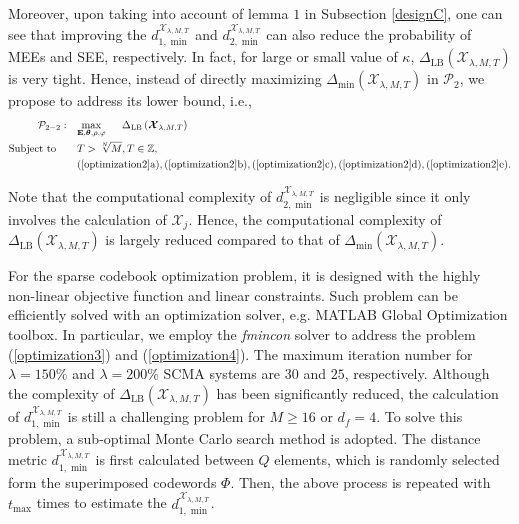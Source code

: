 \documentclass[journal]{IEEEtran}
\begin{document}
Moreover,  upon taking  into account of  lemma $1$ in Subsection \ref{designC}, one can  see that improving the $d_{1, \min}^{   \mathbf {\mathcal X}_{\lambda,M,T}}$ and $d_{2, \min}^{   \mathbf {\mathcal X}_{\lambda,M,T}}$ can also reduce the probability of MEEs and SEE, respectively. In fact, for large or small value of $\kappa$, $\Delta_{\text{LB}}\left( {   \boldsymbol {\mathcal X}_{\lambda,M,T}}\right)$ is very tight.  
Hence, instead of directly maximizing $\Delta_{\min}\left( {   \boldsymbol {\mathcal X}_{\lambda,M,T}}\right) $ in  $ \mathcal {P}_2$, we propose to address its lower bound, i.e.,
\begin{equation}
\label{optimization4}
 \small
\begin{aligned}
\mathcal {P}_{2-2}: \quad   & \underset{\mathbf{E},\boldsymbol{\theta }, \rho,\varphi  }{\mathop{\max }}\quad    \; \; \Delta_{\text{LB}}\left( {   \boldsymbol {\mathcal X}_{\lambda,M,T}      }\right)  \\
\text {Subject to}  \quad \quad    &  T > {\sqrt[N]{M}},  T \in \mathbb Z, \\ & (\ref{optimization2}\text{a}),(\ref{optimization2}\text{b}),(\ref{optimization2}\text{c}),(\ref{optimization2}\text{d}),(\ref{optimization2}\text{e}).
\end{aligned}
\end{equation}

Note that the computational complexity of $d_{2, \min}^{   \mathbf {\mathcal X}_{\lambda,M,T}}$ is negligible  since it only involves the calculation of $\boldsymbol {\mathcal X}_j$. Hence, the computational complexity of  $\Delta_{\text{LB}}\left( {   \boldsymbol {\mathcal X}_{\lambda,M,T}      }\right)$ is largely reduced compared to that of   $\Delta_{\min}\left( {   \boldsymbol {\mathcal X}_{\lambda,M,T}}\right)$. 

For the sparse codebook optimization problem, it is designed with the highly non-linear  objective function  and linear constraints. Such problem can be efficiently solved with an optimization solver, e.g. MATLAB Global Optimization toolbox. In particular, we  employ  the \textit{fmincon} solver to address the problem (\ref{optimization3}) and (\ref{optimization4}).   The maximum iteration number  for $\lambda = 150\%$ and $\lambda = 200\%$ SCMA systems are $30$ and $25$, respectively. Although the complexity of $\Delta_{\text{LB}}\left( {   \boldsymbol {\mathcal X}_{\lambda,M,T}}\right)$ has been significantly reduced,  the calculation of $ d_{1, \min}^{   \mathbf {\mathcal X}_{\lambda,M,T}}$ is still a challenging problem for $M \geq 16$ or $d_f=4$. To solve this problem,  a sub-optimal Monte Carlo search method is adopted.  The  distance metric  $ d_{1, \min}^{   \mathbf {\mathcal X}_{\lambda,M,T}}$ is first calculated between $Q$ elements, which is randomly selected form the superimposed codewords  ${{\Phi }}$. Then, the above process is repeated with $t_{\text{max}}$ times to estimate the  $ d_{1, \min}^{   \mathbf {\mathcal X}_{\lambda,M,T}}$.
\end{document}
